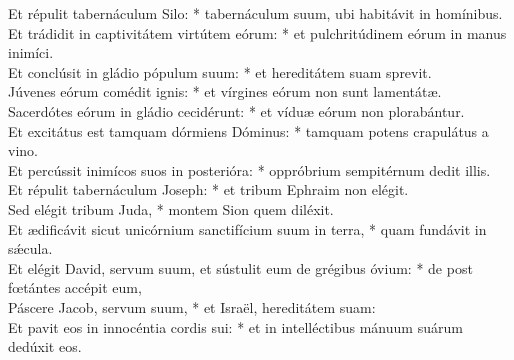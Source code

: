 {	Et répulit tabernáculum Silo: * tabernáculum suum, ubi habitávit in homínibus. \\
	Et trádidit in captivitátem virtútem eórum: * et pulchritúdinem eórum in manus inimíci. \\
	Et conclúsit in gládio pópulum suum: * et hereditátem suam sprevit. \\
	Júvenes eórum comédit ignis: * et vírgines eórum non sunt lamentátæ. \\
	Sacerdótes eórum in gládio cecidérunt: * et víduæ eórum non plorabántur. \\
	Et excitátus est tamquam dórmiens Dóminus: * tamquam potens crapulátus a vino. \\
	Et percússit inimícos suos in posterióra: * oppróbrium sempitérnum dedit illis. \\
	Et répulit tabernáculum Joseph: * et tribum Ephraim non elégit. \\
	Sed elégit tribum Juda, * montem Sion quem diléxit. \\
	Et ædificávit sicut unicórnium sanctifícium suum in terra, * quam fundávit in sǽcula. \\
	Et elégit David, servum suum, et sústulit eum de grégibus óvium: * de post fœtántes accépit eum, \\
	Páscere Jacob, servum suum, * et Israël, hereditátem suam: \\
	Et pavit eos in innocéntia cordis sui: * et in intelléctibus mánuum suárum dedúxit eos. \\
}


